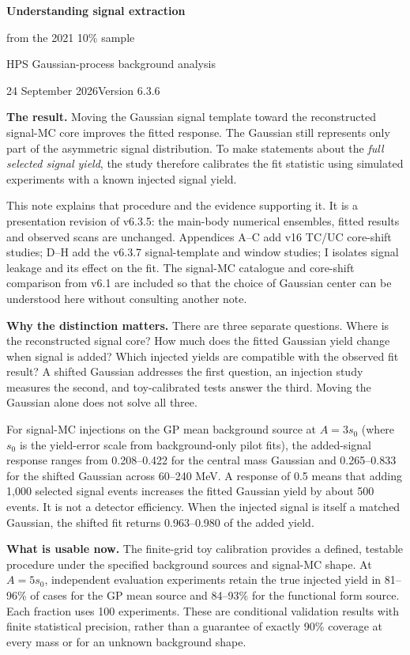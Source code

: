 \documentclass[11pt]{article}
\begin{document}
{\LARGE\bfseries Understanding signal extraction\par from the 2021 10\% sample}\par
{\large HPS Gaussian-process background analysis}\par
24 September 2026\hfill Version 6.3.6

\textbf{The result.} Moving the Gaussian signal template toward the reconstructed signal-MC core improves the fitted response. The Gaussian still represents only part of the asymmetric signal distribution. To make statements about the \emph{full selected signal yield}, the study therefore calibrates the fit statistic using simulated experiments with a known injected signal yield.

This note explains that procedure and the evidence supporting it. It is a presentation revision of v6.3.5: the main-body numerical ensembles, fitted results and observed scans are unchanged. Appendices A--C add v16 TC/UC core-shift studies; D--H add the v6.3.7 signal-template and window studies; I isolates signal leakage and its effect on the fit. The signal-MC catalogue and core-shift comparison from v6.1 are included so that the choice of Gaussian center can be understood here without consulting another note.

\textbf{Why the distinction matters.} There are three separate questions. Where is the reconstructed signal core? How much does the fitted Gaussian yield change when signal is added? Which injected yields are compatible with the observed fit result? A shifted Gaussian addresses the first question, an injection study measures the second, and toy-calibrated tests answer the third. Moving the Gaussian alone does not solve all three.

For signal-MC injections on the GP mean background source at $A=3s_0$ (where $s_0$ is the yield-error scale from background-only pilot fits), the added-signal response ranges from 0.208--0.422 for the central mass Gaussian and 0.265--0.833 for the shifted Gaussian across 60--240 MeV. A response of 0.5 means that adding 1,000 selected signal events increases the fitted Gaussian yield by about 500 events. It is not a detector efficiency. When the injected signal is itself a matched Gaussian, the shifted fit returns 0.963--0.980 of the added yield.

\textbf{What is usable now.} The finite-grid toy calibration provides a defined, testable procedure under the specified background sources and signal-MC shape. At $A=5s_0$, independent evaluation experiments retain the true injected yield in 81--96\% of cases for the GP mean source and 84--93\% for the functional form source. Each fraction uses 100 experiments. These are conditional validation results with finite statistical precision, rather than a guarantee of exactly 90\% coverage at every mass or for an unknown background shape.
\end{document}
